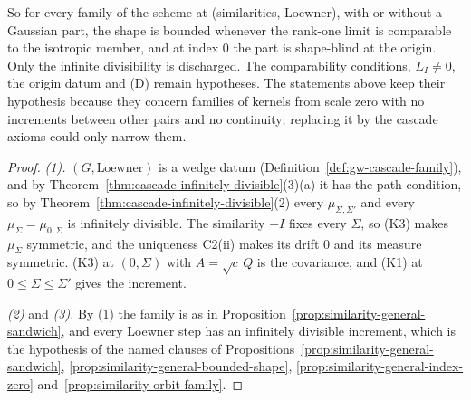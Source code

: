 So for every family of the scheme at (similarities, Loewner), with or without a Gaussian part, the shape
is bounded whenever the rank-one limit is comparable to the isotropic member, and at index $0$ the part
is shape-blind at the origin. Only the infinite divisibility is discharged. The comparability
conditions, $L_I \ne 0$, the origin datum and (D) remain hypotheses. The statements above keep their
hypothesis because they concern families of kernels from scale zero with no increments between other
pairs and no continuity; replacing it by the cascade axioms could only narrow them.

\begin{proof}
\emph{(1).} $(G, \text{Loewner})$ is a wedge datum (Definition~\ref{def:gw-cascade-family}), and by
Theorem~\ref{thm:cascade-infinitely-divisible}(3)(a) it has the path condition, so by
Theorem~\ref{thm:cascade-infinitely-divisible}(2) every $\mu_{\Sigma,\Sigma'}$ and every
$\mu_\Sigma = \mu_{0,\Sigma}$ is infinitely divisible. The similarity $-I$ fixes every $\Sigma$, so (K3)
makes $\mu_\Sigma$ symmetric, and the uniqueness C2(ii) makes its drift $0$ and its \Levy{} measure
symmetric. (K3) at $(0, \Sigma)$ with $A = \sqrt c\,Q$ is the covariance, and (K1) at
$0 \le \Sigma \le \Sigma'$ gives the increment.

\emph{(2)} and \emph{(3).} By (1) the family is as in
Proposition~\ref{prop:similarity-general-sandwich}, and every Loewner step has an infinitely divisible
increment, which is the hypothesis of the named clauses of
Propositions~\ref{prop:similarity-general-sandwich}, \ref{prop:similarity-general-bounded-shape},
\ref{prop:similarity-general-index-zero} and~\ref{prop:similarity-orbit-family}.
\end{proof}
